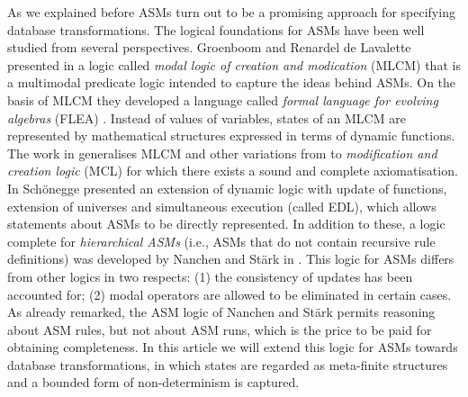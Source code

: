 \documentclass[preprint,11pt]{elsarticle}
\theoremstyle{definition}
\theoremstyle{remark}
\begin{document}
As we explained before ASMs turn out to be a promising approach for
specifying database transformations. The logical foundations for
ASMs have been well studied from several perspectives.
Groenboom and Renardel de Lavalette presented in \cite{GroenboomMLCM94} a logic called \emph{modal logic of
creation and modication} (MLCM) that is a multimodal predicate logic
intended to capture the ideas behind ASMs. On the basis of MLCM they developed a language called
\emph{formal language for evolving algebras} (FLEA) \cite{GroenboomFLEA95}. Instead of
values of variables, states of an MLCM are represented by
mathematical structures expressed in terms of dynamic functions. The
work in \cite{LavalettelogicMCL01} generalises MLCM and other
variations from \cite{FenselMLPM96} to \emph{modification and
creation logic} (MCL) for which there exists a sound and complete
axiomatisation. In \cite{Schoenegge95} Sch\"onegge presented an extension of dynamic
logic with update of functions, extension of universes and
simultaneous execution (called EDL), which allows
statements about ASMs to be directly represented. In addition to
these, a logic complete for \emph{hierarchical ASMs} (i.e., ASMs
that do not contain recursive rule definitions) was developed by Nanchen and St\"ark in
\cite{RobertLogicASM}. This logic for ASMs differs from other logics
in two respects: (1) the consistency of updates has been accounted
for; (2) modal operators are allowed to be eliminated in certain
cases. As already remarked, the ASM logic of Nanchen and St\"ark permits reasoning about ASM rules, but not about ASM runs, which is the price to be paid for obtaining completeness.
In this article we will extend this logic for ASMs towards
database transformations, in which states are regarded as
meta-finite structures and a bounded form of non-determinism is
captured.
\end{document}
